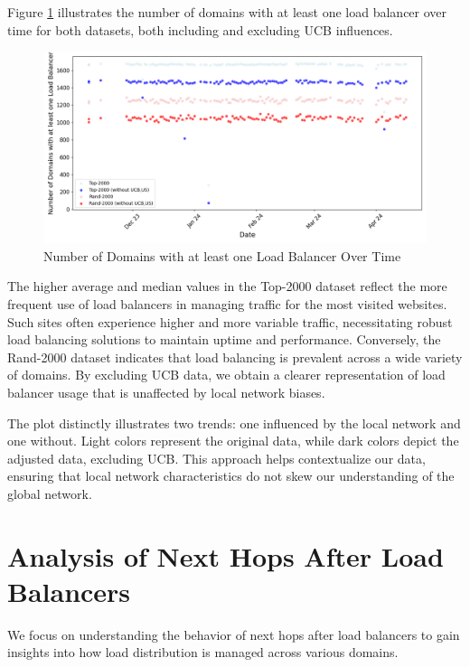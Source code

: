 \documentclass[12pt]{cwru_thesis}
\begin{document}
Figure \ref{fig:stat_plot} illustrates the number of domains with at least one load balancer over time for both datasets, both including and excluding UCB influences.

\begin{figure}[h]
\centering
\includegraphics[width=\textwidth]{figures/scatter_plot_domains.png}
\caption{Number of Domains with at least one Load Balancer Over Time}
\label{fig:stat_plot}
\end{figure}

The higher average and median values in the Top-2000 dataset reflect the more frequent use of load balancers in managing traffic for the most visited websites. Such sites often experience higher and more variable traffic, necessitating robust load balancing solutions to maintain uptime and performance. Conversely, the Rand-2000 dataset indicates that load balancing is prevalent across a wide variety of domains. By excluding UCB data, we obtain a clearer representation of load balancer usage that is unaffected by local network biases.

The plot distinctly illustrates two trends: one influenced by the local network and one without. Light colors represent the original data, while dark colors depict the adjusted data, excluding UCB. This approach helps contextualize our data, ensuring that local network characteristics do not skew our understanding of the global network.





\section{Analysis of Next Hops After Load Balancers}

We focus on understanding the behavior of next hops after load balancers to gain insights into how load distribution is managed across various domains. 
\end{document}
